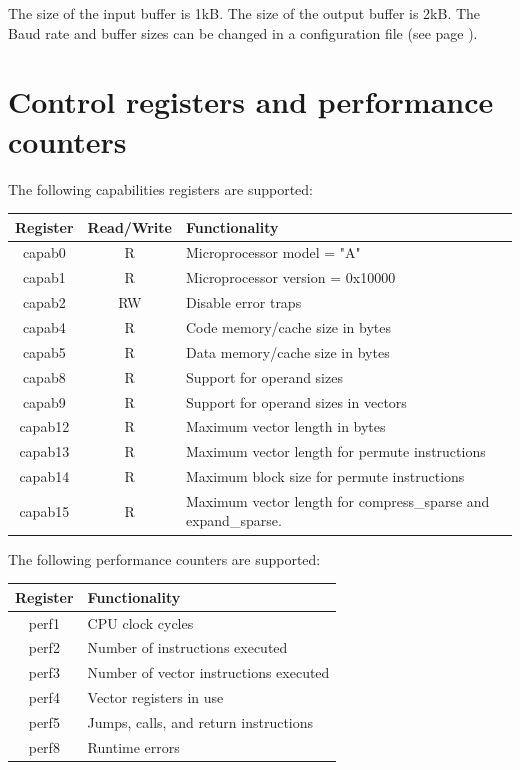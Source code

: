 \documentclass[11pt,a4paper,oneside,openright]{report}
\newcommand{\vv}{ \vspace{2mm} }   %
\begin{document}
The size of the input buffer is 1kB. The size of the output buffer is 2kB. The Baud rate and buffer sizes can be changed in a configuration file (see page \pageref{SettingConfiguration}).
\vv

\chapter{Control registers and performance counters} \label{Chap:ControlRegisters}

The following capabilities registers are supported:
\vv

\begin{tabular}{|c|c|l|} 
\hline
\bfseries Register & \bfseries Read/Write & \bfseries Functionality \\ \hline
capab0 & R   & Microprocessor model = "A" \\ \hline
capab1 & R  & Microprocessor version = 0x10000 \\ \hline
capab2 & RW & Disable error traps \\ \hline
capab4 & R  & Code memory/cache size in bytes \\ \hline
capab5 & R  & Data memory/cache size in bytes \\ \hline

capab8 & R  & Support for operand sizes \\ \hline
capab9 & R  & Support for operand sizes in vectors \\ \hline
capab12 & R & Maximum vector length in bytes \\ \hline
capab13 & R & Maximum vector length for permute instructions \\ \hline
capab14 & R & Maximum block size for permute instructions \\ \hline
capab15 & R & Maximum vector length for compress\_sparse and expand\_sparse. \\ \hline
\end{tabular}
\vv
\vv
\vv

The following performance counters are supported:
\vv

\begin{tabular}{|c|l|} 
\hline
\bfseries Register & \bfseries Functionality \\ \hline
perf1  & CPU clock cycles \\ \hline
perf2  & Number of instructions executed \\ \hline
perf3  & Number of vector instructions executed \\ \hline
perf4  & Vector registers in use \\ \hline
perf5  & Jumps, calls, and return instructions \\ \hline
perf8  & Runtime errors \\ \hline
\hline
\end{tabular}
\vv
\end{document}
